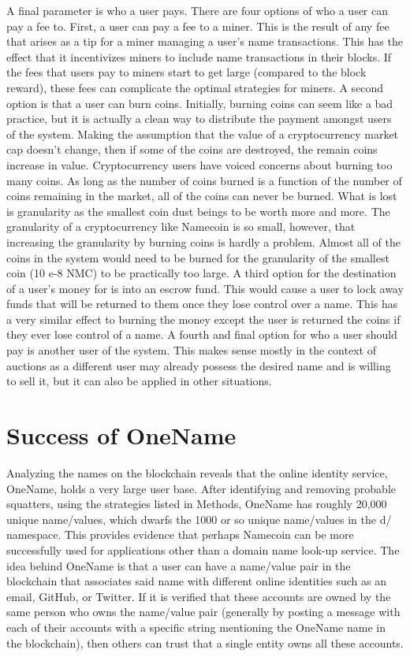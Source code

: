     A final parameter is who a user pays. There are four options of who a user can pay a fee to. First, a user can pay a fee to a miner. This is the result of any fee that arises as a tip for a miner managing a user's name transactions. This has the effect that it incentivizes miners to include name transactions in their blocks. If the fees that users pay to miners start to get large (compared to the block reward), these fees can complicate the optimal strategies for miners. A second option is that a user can burn coins. Initially, burning coins can seem like a bad practice, but it is actually a clean way to distribute the payment amongst users of the system. Making the assumption that the value of a cryptocurrency market cap doesn't change, then if some of the coins are destroyed, the remain coins increase in value.  Cryptocurrency users have voiced concerns about burning too many coins. As long as the number of coins burned is a function of the number of coins remaining in the market, all of the coins can never be burned. What is lost is granularity as the smallest coin dust beings to be worth more and more. The granularity of a cryptocurrency like Namecoin is so small, however, that increasing the granularity by burning coins is hardly a problem. Almost all of the coins in the system would need to be burned for the granularity of the smallest coin (10 e-8 NMC) to be practically too large. A third option for the destination of a user's money for is into an escrow fund. This would cause a user to lock away funds that will be returned to them once they lose control over a name. This has a very similar effect to burning the money except the user is returned the coins if they ever lose control of a name. A fourth and final option for who a user should pay is another user of the system. This makes sense mostly in the context of auctions as a different user may already possess the desired name and is willing to sell it, but it can also be applied in other situations.



\section{Success of OneName}
    Analyzing the names on the blockchain reveals that the online identity service, OneName, holds a very large user base. After identifying and removing probable squatters, using the strategies listed in Methods, OneName has roughly 20,000 unique name/values, which dwarfs the 1000 or so unique name/values in the d/ namespace. This provides evidence that perhaps Namecoin can be more successfully used for applications other than a domain name look-up service. The idea behind OneName is that a user can have a name/value pair in the blockchain that associates said name with different online identities such as an email, GitHub, or Twitter. If it is verified that these accounts are owned by the same person who owns the name/value pair (generally by posting a message with each of their accounts with a specific string mentioning the OneName name in the blockchain), then others can trust that a single entity owns all these accounts. 

